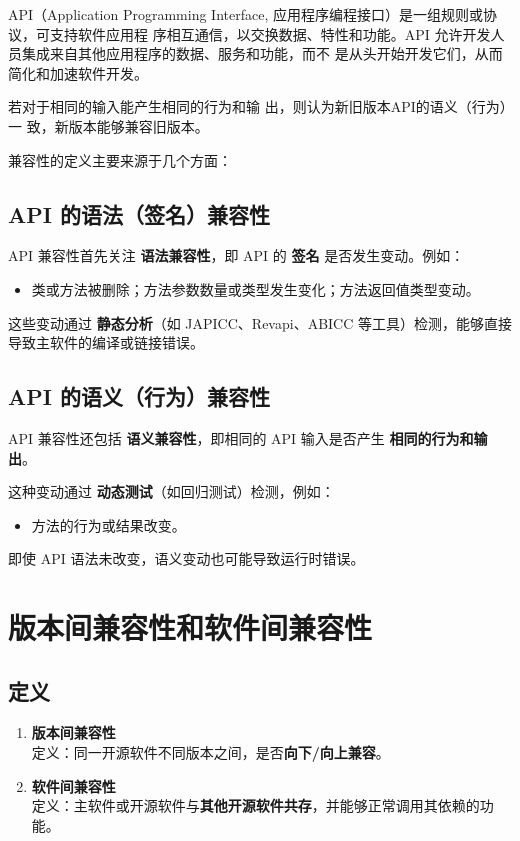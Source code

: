 \documentclass[14pt,a4paper,UTF8,twoside]{article}
\begin{document}
API（Application Programming Interface, 应用程序编程接口）是一组规则或协议，可支持软件应用程
序相互通信，以交换数据、特性和功能。API 允许开发人员集成来自其他应用程序的数据、服务和功能，而不
是从头开始开发它们，从而简化和加速软件开发。

若对于相同的输入能产生相同的行为和输
出，则认为新旧版本API的语义（行为）一
致，新版本能够兼容旧版本。

兼容性的定义主要来源于几个方面：

\subsection*{API 的语法（签名）兼容性}

API 兼容性首先关注 \textbf{语法兼容性}，即 API 的 \textbf{签名} 是否发生变动。例如：

\begin{itemize}
    \item 类或方法被删除；方法参数数量或类型发生变化；方法返回值类型变动。
\end{itemize}

这些变动通过 \textbf{静态分析}（如 JAPICC、Revapi、ABICC 等工具）检测，能够直接导致主软件的编译或链接错误。

\subsection*{API 的语义（行为）兼容性}

API 兼容性还包括 \textbf{语义兼容性}，即相同的 API 输入是否产生 \textbf{相同的行为和输出}。

这种变动通过 \textbf{动态测试}（如回归测试）检测，例如：

\begin{itemize}
    \item 方法的行为或结果改变。
\end{itemize}

即使 API 语法未改变，语义变动也可能导致运行时错误。

\section{版本间兼容性和软件间兼容性}

\subsection{定义}
\begin{enumerate}[label=\arabic*.]
    \item \textbf{版本间兼容性} \\
    定义：同一开源软件不同版本之间，是否\textbf{向下/向上兼容}。\\
    
    \item \textbf{软件间兼容性} \\
    定义：主软件或开源软件与\textbf{其他开源软件共存}，并能够正常调用其依赖的功能。\\
\end{enumerate}
\end{document}
